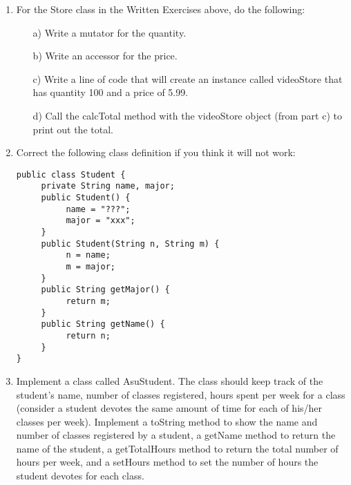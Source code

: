 \setcounter{counter}{1}
\begin{enumerate}[label={\arabic{counter}\addtocounter{counter}{1}}.]

\item For the Store class in the Written Exercises above, do the following:
\begin{enumerate}
\item[a)]Write a mutator for the quantity.
\item[b)]Write an accessor for the price.
\item[c)]Write a line of code that will create an instance called videoStore that has quantity 100 and a price of 5.99.
\item[d)]Call the calcTotal method with the videoStore object (from part c) to print out the total.
\end{enumerate}

\item Correct the following class definition if you think it will not work:
\begin{lstlisting}
public class Student {
     private String name, major;
     public Student() {
          name = "???";
          major = "xxx";
     }
     public Student(String n, String m) {
          n = name;
          m = major;
     }
     public String getMajor() {
          return m;
     }
     public String getName() {
          return n;
     }
}
\end{lstlisting}

\item Implement a class called AsuStudent. The class should keep track of the student's name, number of classes registered, hours spent per week for a class (consider a student devotes the same amount of time for each of his/her classes per week). Implement a toString method to show the name and number of classes registered by a student, a getName method to return the name of the student, a getTotalHours method to return the total number of hours per week, and a setHours method to set the number of hours the student devotes for each class.

\end{enumerate}